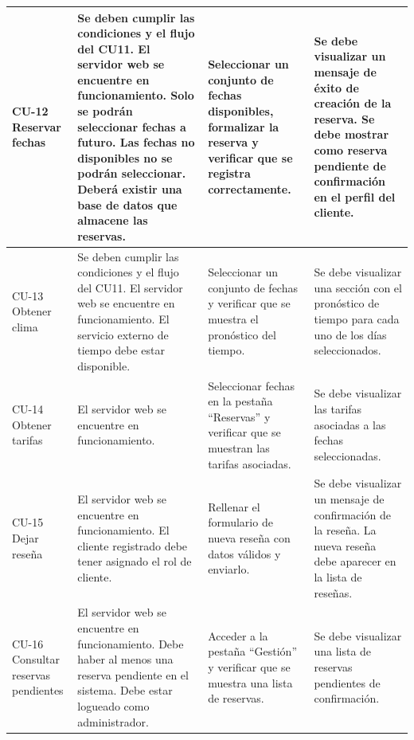 \begin{longtable}{|p{2.5cm}|p{3.5cm}|p{4.5cm}|p{5cm}|}
CU-12 Reservar fechas &
Se deben cumplir las condiciones y el flujo del CU11. \newline El servidor web se encuentre en funcionamiento. \newline Solo se podrán seleccionar fechas a futuro. \newline Las fechas no disponibles no se podrán seleccionar. \newline Deberá existir una base de datos que almacene las reservas. &
Seleccionar un conjunto de fechas disponibles, formalizar la reserva y verificar que se registra correctamente. &
Se debe visualizar un mensaje de éxito de creación de la reserva. \newline Se debe mostrar como reserva pendiente de confirmación en el perfil del cliente. \\ \hline

CU-13 Obtener clima &
Se deben cumplir las condiciones y el flujo del CU11. \newline El servidor web se encuentre en funcionamiento. \newline El servicio externo de tiempo debe estar disponible. &
Seleccionar un conjunto de fechas y verificar que se muestra el pronóstico del tiempo. &
Se debe visualizar una sección con el pronóstico de tiempo para cada uno de los días seleccionados. \\ \hline

CU-14 Obtener tarifas &
El servidor web se encuentre en funcionamiento. &
Seleccionar fechas en la pestaña ``Reservas'' y verificar que se muestran las tarifas asociadas. &
Se debe visualizar las tarifas asociadas a las fechas seleccionadas. \\ \hline

CU-15 Dejar reseña &
El servidor web se encuentre en funcionamiento. \newline El cliente registrado debe tener asignado el rol de cliente. &
Rellenar el formulario de nueva reseña con datos válidos y enviarlo. &
Se debe visualizar un mensaje de confirmación de la reseña. \newline La nueva reseña debe aparecer en la lista de reseñas. \\ \hline

CU-16 Consultar reservas pendientes &
El servidor web se encuentre en funcionamiento. \newline Debe haber al menos una reserva pendiente en el sistema. Debe estar logueado como administrador. &
Acceder a la pestaña ``Gestión'' y verificar que se muestra una lista de reservas. &
Se debe visualizar una lista de reservas pendientes de confirmación. \\ \hline


\end{longtable}
